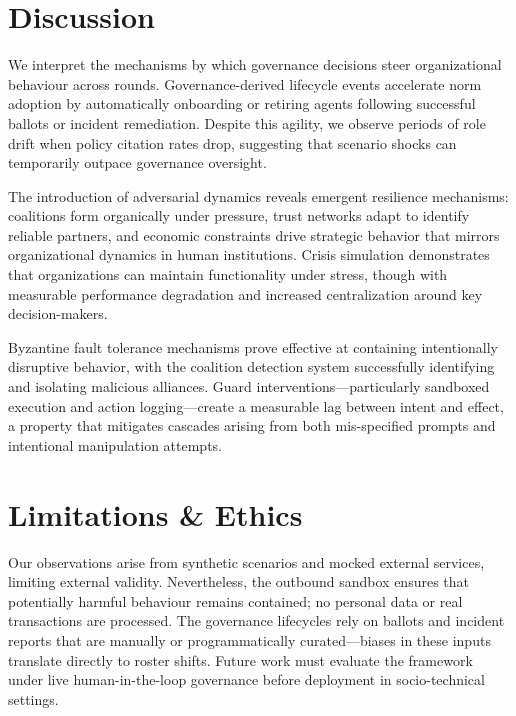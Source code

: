 \documentclass[11pt]{article}
\begin{document}
\section{Discussion}
We interpret the mechanisms by which governance decisions steer organizational behaviour across rounds. Governance-derived lifecycle events accelerate norm adoption by automatically onboarding or retiring agents following successful ballots or incident remediation. Despite this agility, we observe periods of role drift when policy citation rates drop, suggesting that scenario shocks can temporarily outpace governance oversight.

The introduction of adversarial dynamics reveals emergent resilience mechanisms: coalitions form organically under pressure, trust networks adapt to identify reliable partners, and economic constraints drive strategic behavior that mirrors organizational dynamics in human institutions. Crisis simulation demonstrates that organizations can maintain functionality under stress, though with measurable performance degradation and increased centralization around key decision-makers.

Byzantine fault tolerance mechanisms prove effective at containing intentionally disruptive behavior, with the coalition detection system successfully identifying and isolating malicious alliances. Guard interventions—particularly sandboxed execution and action logging—create a measurable lag between intent and effect, a property that mitigates cascades arising from both mis-specified prompts and intentional manipulation attempts.

\section{Limitations \& Ethics}
Our observations arise from synthetic scenarios and mocked external services, limiting external validity. Nevertheless, the outbound sandbox ensures that potentially harmful behaviour remains contained; no personal data or real transactions are processed. The governance lifecycles rely on ballots and incident reports that are manually or programmatically curated—biases in these inputs translate directly to roster shifts. Future work must evaluate the framework under live human-in-the-loop governance before deployment in socio-technical settings.
\end{document}
